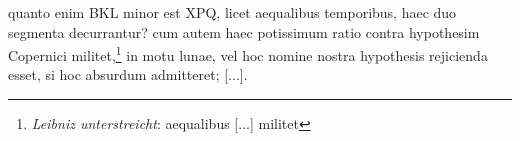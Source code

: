 \pend \pstart [p.~208] [...] quanto enim BKL minor est  XPQ, licet aequalibus temporibus, haec duo segmenta decurrantur? cum autem haec potissimum ratio contra  hypothesim Copernici\protect{} militet,\footnote{\textit{Leibniz unterstreicht}: aequalibus [...] militet} in motu lunae, vel hoc  nomine nostra hypothesis rejicienda esset, si hoc absurdum admitteret; [...].
